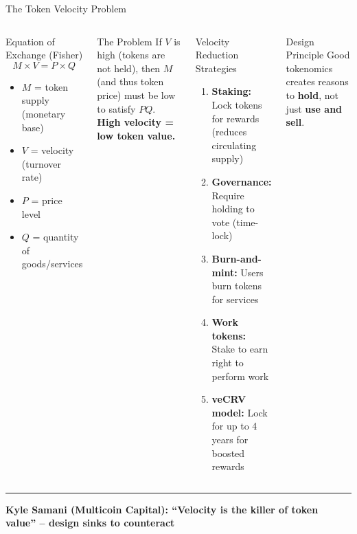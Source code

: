\documentclass[8pt,aspectratio=169]{beamer}
\newcommand{\bottomnote}[1]{\vfill\vspace{-2mm}\textcolor{mllavender2}{\rule{\textwidth}{0.4pt}}\vspace{1mm}\footnotesize\textbf{#1}}
\begin{document}
\begin{frame}{The Token Velocity Problem}
\begin{columns}[T]
\begin{block}{Equation of Exchange (Fisher)}
\footnotesize
\[
M \times V = P \times Q
\]
\begin{itemize}
  \item $M$ = token supply (monetary base)
  \item $V$ = velocity (turnover rate)
  \item $P$ = price level
  \item $Q$ = quantity of goods/services
\end{itemize}
\end{block}
\vspace{2mm}
\begin{alertblock}{\footnotesize The Problem}
\footnotesize
If $V$ is high (tokens are not held), then $M$ (and thus token price) must be low to satisfy $PQ$.\\[2mm]
\textbf{High velocity = low token value.}
\end{alertblock}

\begin{block}{Velocity Reduction Strategies}
\footnotesize
\begin{enumerate}
  \item \textbf{Staking:} Lock tokens for rewards (reduces circulating supply)
  \item \textbf{Governance:} Require holding to vote (time-lock)
  \item \textbf{Burn-and-mint:} Users burn tokens for services
  \item \textbf{Work tokens:} Stake to earn right to perform work
  \item \textbf{veCRV model:} Lock for up to 4 years for boosted rewards
\end{enumerate}
\end{block}
\vspace{1mm}
\begin{exampleblock}{\footnotesize Design Principle}
\footnotesize
Good tokenomics creates reasons to \textbf{hold}, not just \textbf{use and sell}.
\end{exampleblock}
\end{columns}
\bottomnote{Kyle Samani (Multicoin Capital): ``Velocity is the killer of token value'' -- design sinks to counteract}
\end{frame}
\end{document}
